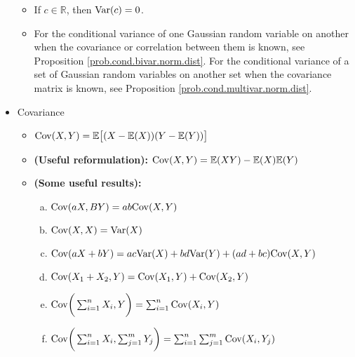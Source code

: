 \begin{itemize}
\begin{itemize}
\item \begin{proposition}\label{prob.const.var}If \(c \in \mathbb{R}\), then \(\mathrm{Var}(c) = 0\).
\end{proposition}

\item  For the conditional variance of one Gaussian random variable on another when the covariance or correlation between them is known, see Proposition \ref{prob.cond.bivar.norm.dist}. For the conditional variance of a set of Gaussian random variables on another set when the covariance matrix is known, see Proposition \ref{prob.cond.multivar.norm.dist}. 

\end{itemize}

\item Covariance

\begin{itemize}

\item \begin{definition} \( \mathrm{Cov}(X, Y ) = \mathbb{E} \big[ (X - \mathbb{E}(X))(Y - \mathbb{E}(Y))\big] \) \end{definition}

\item \begin{proposition} \textbf{(Useful reformulation):} \(\mathrm{Cov}(X, Y) = \mathbb{E}(XY) - \mathbb{E}(X)\mathbb{E}(Y)\) \end{proposition}

\item \begin{theorem} \textbf{(Some useful results):} 


\begin{enumerate}[(a)]

\item \(\mathrm{Cov}(aX, BY) = ab \mathrm{Cov}(X, Y)\)

\item \(\mathrm{Cov}(X, X) = \mathrm{Var}(X)\)

\item \(\mathrm{Cov}(aX + bY) = ac\mathrm{Var}(X) + bd\mathrm{Var}(Y) + (ad + bc)\mathrm{Cov}(X, Y)\)

\item \(\mathrm{Cov}(X_1 + X_2, Y) = \mathrm{Cov}(X_1, Y) + \mathrm{Cov}(X_2, Y)\)

\item \(\mathrm{Cov}\bigg( \sum_{i=1}^n X_i , Y\bigg) = \sum_{i=1}^n \mathrm{Cov}(X_i, Y)\)

\item \(\mathrm{Cov}\bigg( \sum_{i=1}^n X_i, \sum_{j=1}^m Y_j \bigg) = \sum_{i=1}^n \sum_{j=1}^m \mathrm{Cov}(X_i, Y_j)
\)


\end{enumerate}
\end{theorem}
\end{itemize}
\end{itemize}
